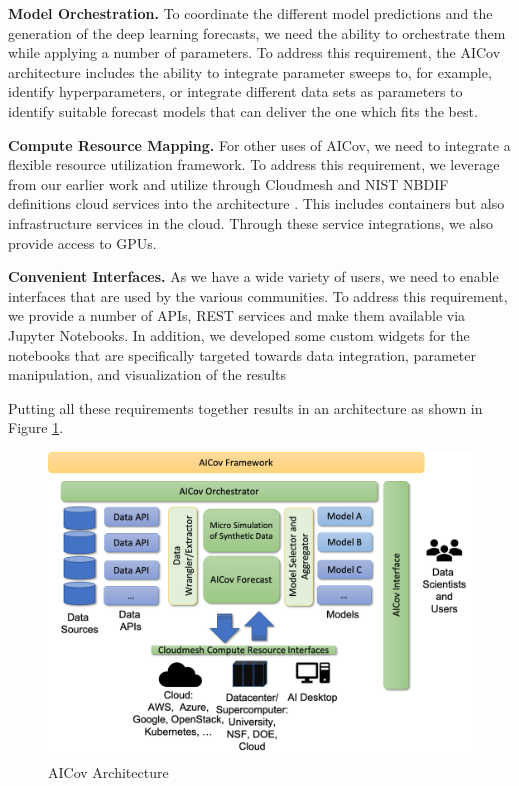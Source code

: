 \documentclass[letterpaper, inpress]{jds} %
\renewcommand{\_}{%
    \textunderscore\hspace{0pt}%
}
\begin{document}
\begin{requirement}{\bf Model Orchestration.}
  To coordinate the different model predictions and the generation of
  the deep learning forecasts, we need the ability to orchestrate them
  while applying a number of parameters. \Solution To address this
  requirement, the AICov architecture includes the ability to
  integrate parameter sweeps to, for example, identify
  hyperparameters, or integrate different data sets as parameters to
  identify suitable forecast models that can deliver the one which
  fits the best.
\end{requirement}

\begin{requirement}{\bf Compute Resource Mapping.}
  For other uses of AICov, we need to integrate a flexible resource
  utilization framework. \Solution To address this requirement, we
  leverage from our earlier work and utilize through Cloudmesh and
  NIST NBDIF definitions cloud services into the architecture
  \cite{las-19-nist}. This includes containers but also infrastructure
  services in the cloud. Through these service integrations, we also
  provide access to GPUs.
\end{requirement}

\begin{requirement}{\bf Convenient Interfaces.}
  As we have a wide variety of users, we need to enable interfaces
  that are used by the various communities. \Solution To address this
  requirement, we provide a number of APIs, REST services and make
  them available via Jupyter Notebooks. In addition, we developed some
  custom widgets for the notebooks that are specifically targeted
  towards data integration, parameter manipulation, and visualization
  of the results
\end{requirement}


Putting all these requirements together results in an architecture as
shown in Figure \ref{fig:arch}.\\

\begin{figure}[h!]
    \centering
    \includegraphics[width=0.6\columnwidth]{images/arch.pdf}
    \caption{AICov Architecture}
    \label{fig:arch}
\end{figure}
\end{document}
